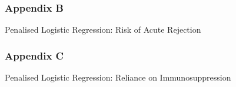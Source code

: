 \documentclass[a4paper,9pt,twocolumn,twoside,]{pinp}
\begin{document}
\hypertarget{appendix-b}{%
\subsubsection{Appendix B}\label{appendix-b}}

Penalised Logistic Regression: Risk of Acute Rejection

\hypertarget{appendix-c}{%
\subsubsection{Appendix C}\label{appendix-c}}

Penalised Logistic Regression: Reliance on Immunosuppression





\end{document}
